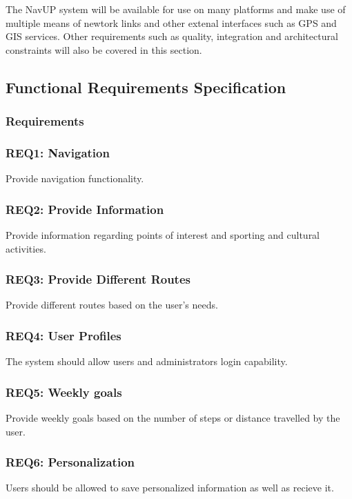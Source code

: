 \documentclass[11pt,a4paper]{article}
\begin{document}
		The NavUP system will be available for use on many platforms and make use of multiple means of newtork links and other extenal interfaces such as GPS and GIS services.
		Other requirements such as quality, integration and architectural constraints will also be covered in this section.
		
	\subsection{Functional Requirements Specification}
	\subsubsection{Requirements}
		
		\subsubsection {REQ1: Navigation}
			Provide navigation functionality.
			
		\subsubsection {REQ2: Provide Information}
			Provide information regarding points of interest and sporting and cultural activities.
			
		\subsubsection{REQ3: Provide Different Routes}
			Provide different routes based on the user's needs.
		
		\subsubsection{REQ4: User Profiles}
			The system should allow users and administrators login capability.
			
		\subsubsection{REQ5: Weekly goals}
			Provide weekly goals based on the number of steps or distance travelled by the user.
			
		\subsubsection{REQ6: Personalization}
			Users should be allowed to save personalized information as well as recieve it.
			
\end{document}
